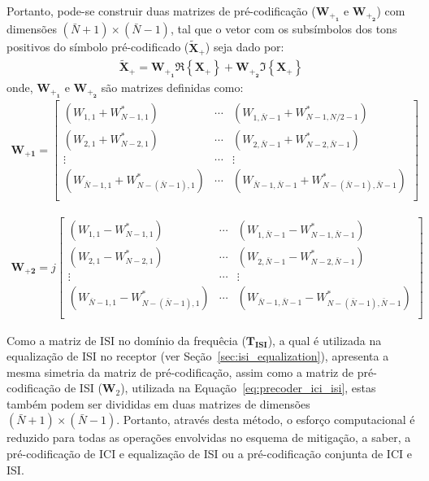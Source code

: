 
Portanto, pode-se construir duas matrizes de pré-codificação ($\mathbf{W_{+_1}}$ e $\mathbf{W_{+_2}}$) com dimensões $(\bar{N} + 1) \times (\bar{N} -1)$, tal que o vetor com os subsímbolos dos tons positivos do símbolo pré-codificado ($\mathbf{\tilde{X}}_+$) seja dado por:
\begin{align}
\mathbf{\tilde{X}}_+ = \mathbf{W_{+_1}} \Re\left\{\mathbf{X_+}\right\} + \mathbf{W_{+_2}} \Im\left\{ \mathbf{X_+} \right\}
\label{eq:precodificacao_positiva}
\end{align}
onde, $\mathbf{W_{+_1}}$ e  $\mathbf{W_{+_2}}$ são matrizes definidas como:
\begin{align}
\mathbf{W_{+1}} = \left[ 
\begin{array}{ccc}
\left( W_{1,1} + W_{N-1,1}^*\right) & \cdots & \left( W_{1,\bar{N} -1} + W_{N-1,N/2-1}^*\right)\\
\left( W_{2,1} + W_{N-2,1}^*\right) & \cdots & \left( W_{2,\bar{N}-1} + W_{N-2,\bar{N} -1}^*\right)\\
\vdots & \cdots & \vdots\\
\left( W_{\bar{N} -1,1} + W_{N-\left(\bar{N} -1\right),1}^*\right) & \cdots & \left( W_{\bar{N} -1,\bar{N} -1} + W_{N-\left(\bar{N} -1\right),\bar{N}-1}^*\right)\\
\end{array}	
\right]
\end{align}

\begin{align}
\mathbf{W_{+2}} = j\left[ 
\begin{array}{ccccc}
\left( W_{1,1} - W_{N-1,1}^*\right) & \cdots & \left( W_{1,\bar{N} -1} - W_{N-1,\bar{N} -1}^*\right)\\
\left( W_{2,1} - W_{N-2,1}^*\right) & \cdots & \left( W_{2,\bar{N} -1} - W_{N-2,\bar{N}-1}^*\right)\\
\vdots & \cdots & \vdots\\
\left( W_{\bar{N} -1,1} - W_{N-\left(\bar{N} -1\right),1}^*\right) & \cdots & \left( W_{\bar{N} -1,\bar{N} -1} - W_{N-\left(\bar{N} -1\right),\bar{N} -1}^*\right)\\
\end{array}	
\right]
\end{align}

Como a matriz de ISI no domínio da frequêcia ($\mathbf{ T_\text{ISI}}$), a qual é utilizada na equalização de ISI no receptor (ver Seção~\ref{sec:isi_equalization}), apresenta a mesma simetria da matriz de pré-codificação, assim como a matriz de pré-codificação de ISI ($\mathbf{W}_2$), utilizada na Equação~\ref{eq:precoder_ici_isi}, estas também podem ser divididas em duas matrizes de dimensões $(\bar{N} + 1) \times (\bar{N} -1)$. Portanto, através desta método, o esforço computacional é reduzido para todas as operações envolvidas no esquema de mitigação, a saber, a pré-codificação de ICI e equalização de ISI ou a pré-codificação conjunta de ICI e ISI.

